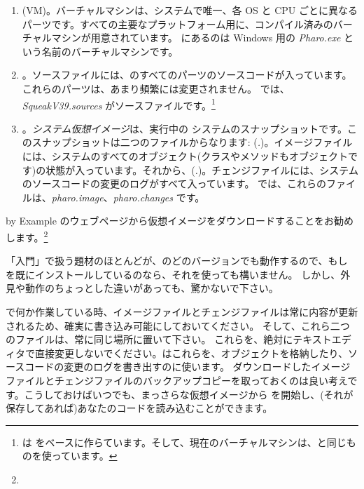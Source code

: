 \documentclass[a4paper,10pt,twoside]{book}
\begin{document}
\begin{enumerate}

  \item {} (VM)。バーチャルマシンは、システムで唯一、各 OS と CPU ごとに異なるパーツです。すべての主要なプラットフォーム用に、コンパイル済みのバーチャルマシンが用意されています。 にあるのは Windows 用の \textit{Pharo.exe} という名前のバーチャルマシンです。

  \item {}。ソースファイルには、\pharo のすべてのパーツのソースコードが入っています。これらのパーツは、あまり頻繁には変更されません。 では、\emph{SqueakV39.sources} がソースファイルです。\footnote{\pharo は  をベースに作らています。そして、現在のバーチャルマシンは、\squeak と同じものを使っています。}

  \item {}。\emph{システム仮想イメージ}は、実行中の \pharo システムのスナップショットです。このスナップショットは二つのファイルからなります: (\emph{.})。イメージファイルには、システムのすべてのオブジェクト(クラスやメソッドもオブジェクトです)の状態が入っています。それから、(\emph{.})。チェンジファイルには、システムのソースコードの変更のログがすべて入っています。
 では、これらのファイルは、\emph{pharo.image}、\emph{pharo.changes} です。
\end{enumerate}

\pharo by Example のウェブページから仮想イメージをダウンロードすることをお勧めします。\footnote{\pbe}

「入門」で扱う題材のほとんどが、\pharo のどのバージョンでも動作するので、もし \pharo を既にインストールしているのなら、それを使っても構いません。
しかし、外見や動作のちょっとした違いがあっても、驚かないで下さい。

\pharo で何か作業している時、イメージファイルとチェンジファイルは常に内容が更新されるため、確実に書き込み可能にしておいてください。
そして、これら二つのファイルは、常に同じ場所に置いて下さい。
これらを、絶対にテキストエディタで直接変更しないでください。\pharo はこれらを、オブジェクトを格納したり、ソースコードの変更のログを書き出すのに使います。
ダウンロードしたイメージファイルとチェンジファイルのバックアップコピーを取っておくのは良い考えです。こうしておけばいつでも、まっさらな仮想イメージから \pharo を開始し、(それが保存してあれば)あなたのコードを読み込むことができます。
\end{document}
